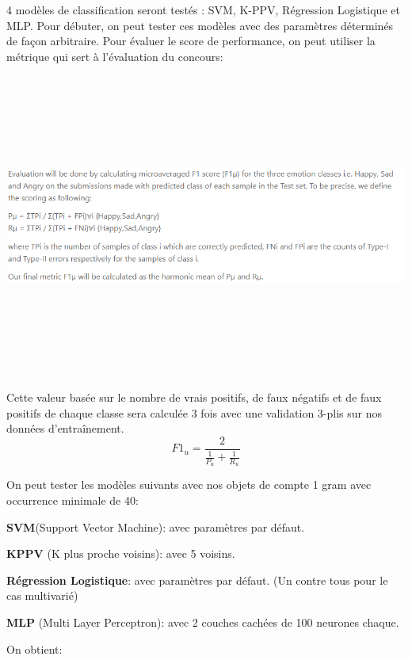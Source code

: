 4 modèles de classification seront testés : SVM, K-PPV, Régression Logistique et MLP. Pour débuter, on peut tester ces modèles avec des paramètres déterminés de façon arbitraire. Pour évaluer le score de performance, on peut utiliser la métrique qui sert à l'évaluation du concours:

\includegraphics[width=\linewidth,height=10cm,keepaspectratio]{images/metric_concour}

Cette valeur basée sur le nombre de vrais positifs, de faux négatifs et de faux positifs de chaque classe sera calculée 3 fois avec une validation 3-plis sur nos données d'entraînement.
\begin{equation}
F1_{u} =\frac{2}{\frac{1}{P_{u}}+\frac{1}{R_{u}}}
\end{equation}

On peut tester les modèles suivants avec nos objets de compte 1 gram avec occurrence minimale de 40:
\begin{description}
\item \textbf{SVM}(Support Vector Machine): avec paramètres par défaut.
\item \textbf{KPPV} (K plus proche voisins): avec 5 voisins.
\item \textbf{Régression Logistique}: avec paramètres par défaut. (Un contre tous pour le cas multivarié)
\item \textbf{MLP} (Multi Layer Perceptron): avec 2 couches cachées de 100 neurones chaque.
\end{description}


On obtient:

